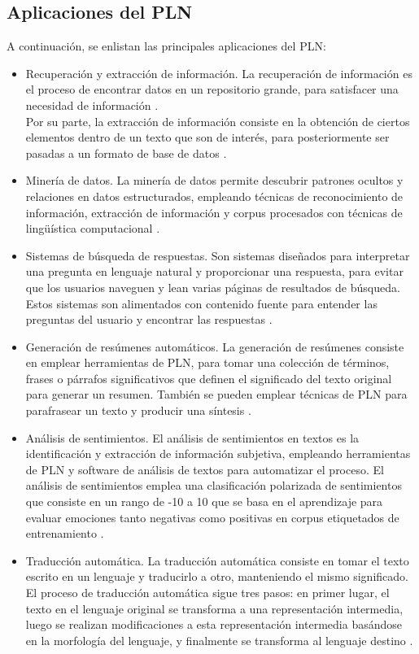 \subsection{Aplicaciones del PLN}
A continuación, se enlistan las principales aplicaciones del PLN:
\begin{itemize}
    \item Recuperación y extracción de información. La recuperación de información es el proceso de encontrar datos en un repositorio grande, para satisfacer una necesidad de información \cite{ref48}.\\ 
    Por su parte, la extracción de información consiste en la obtención de ciertos elementos dentro de un texto que son de interés, para posteriormente ser pasadas a un formato de base de datos \cite{ref48}.    
    \item Minería de datos. La minería de datos permite descubrir patrones ocultos y relaciones en datos estructurados, empleando técnicas de reconocimiento de información, extracción de información y corpus procesados con técnicas de lingüística computacional \cite{ref48}.
    \item Sistemas de búsqueda de respuestas. Son sistemas diseñados para interpretar una pregunta en lenguaje natural y proporcionar una respuesta, para evitar que los usuarios naveguen y lean varias páginas de resultados de búsqueda. Estos sistemas son alimentados con contenido fuente para entender las preguntas del usuario y encontrar las respuestas \cite{ref48}.
    \item Generación de resúmenes automáticos. La generación de resúmenes consiste en emplear herramientas de PLN, para tomar una colección de términos, frases o párrafos significativos que definen el significado del texto original para generar un resumen. También se pueden emplear técnicas de PLN para parafrasear un texto y producir una síntesis \cite{ref48}.
    \item Análisis de sentimientos. El análisis de sentimientos en textos es la identificación y extracción de información subjetiva, empleando herramientas de PLN y software de análisis de textos para automatizar el proceso. El análisis de sentimientos emplea una clasificación polarizada de sentimientos que consiste en un rango de -10 a 10 que se basa en el aprendizaje para evaluar emociones tanto negativas como positivas en corpus etiquetados de entrenamiento \cite{ref48}.
    \item Traducción automática. La traducción automática consiste en tomar el texto escrito en un lenguaje y traducirlo a otro, manteniendo el mismo significado. El proceso de traducción automática sigue tres pasos: en primer lugar, el texto en el lenguaje original se transforma a una representación intermedia, luego se realizan modificaciones a esta representación intermedia basándose en la morfología del lenguaje, y finalmente se transforma al lenguaje destino \cite{ref48}.
\end{itemize}

